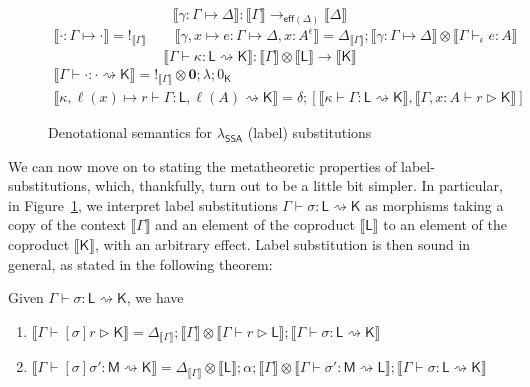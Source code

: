 \documentclass[acmsmall,screen,review]{acmart}
\newcommand{\mb}[1]{\ensuremath{\mathbf{#1}}}
\newcommand{\ms}[1]{\ensuremath{\mathsf{#1}}}
\newcommand{\thyp}[3]{#1 : {#2}^{#3}}
\newcommand{\bhyp}[2]{#1 : #2}
\newcommand{\hasty}[4]{#1 \vdash_{#2} #3: {#4}}
\newcommand{\haslb}[3]{#1 \vdash #2 \rhd #3}
\newcommand{\issubst}[3]{#1: #2 \mapsto #3}
\newcommand{\lbsubst}[4]{#1 \vdash #2: #3 \rightsquigarrow #4}
\newcommand{\dnt}[1]{\llbracket{#1}\rrbracket}
\newcommand{\tmor}[1]{{!}_{#1}}
\newcommand{\dmor}[1]{{\Delta}_{#1}}
\newcommand{\isotopessa}{\(\lambda_{\ms{SSA}}\)}
\begin{document}
\begin{figure}
  \begin{equation*}
    \boxed{\dnt{\issubst{\gamma}{\Gamma}{\Delta}} 
      : \dnt{\Gamma} \to_{\ms{eff}(\Delta)} \dnt{\Delta}}
  \end{equation*}
  \begin{gather*}
    \dnt{\issubst{\cdot}{\Gamma}{\cdot}} = \tmor{\dnt{\Gamma}}
    \qquad
    \dnt{\issubst{\gamma, x \mapsto e}{\Gamma}{\Delta, \thyp{x}{A}{\epsilon}}}
    = \dmor{\dnt{\Gamma}};\dnt{\issubst{\gamma}{\Gamma}{\Delta}} 
      \otimes \dnt{\hasty{\Gamma}{\epsilon}{e}{A}}
  \end{gather*}
  \begin{equation*}
    \boxed{\dnt{\lbsubst{\Gamma}{\kappa}{\ms{L}}{\ms{K}}} 
      : \dnt{\Gamma} \otimes \dnt{\ms{L}} \to \dnt{\ms{K}}}
  \end{equation*}
  \begin{gather*}
    \dnt{\lbsubst{\Gamma}{\cdot}{\cdot}{\ms{K}}} 
      = \tmor{\dnt{\Gamma}} \otimes \mb{0}; \lambda; 0_{\ms{K}}
    \\
    \dnt{\lbsubst{\kappa, \ell(x) \mapsto r}{\Gamma}{\ms{L}, \ell(A)}{\ms{K}}}
      = \delta ; [
      \dnt{\lbsubst{\kappa}{\Gamma}{\ms{L}}{\ms{K}}}, 
      \dnt{\haslb{\Gamma, \bhyp{x}{A}}{r}{\ms{K}}}
    ]
  \end{gather*}
  \caption{Denotational semantics for \isotopessa{} (label) substitutions}
  \Description{}
  \label{fig:ssa-subst-sem} 
\end{figure}

We can now move on to stating the metatheoretic properties of label-substitutions, which,
thankfully, turn out to be a little bit simpler. In particular, in Figure~\ref{fig:ssa-subst-sem},
we interpret label substitutions $\lbsubst{\Gamma}{\sigma}{\ms{L}}{\ms{K}}$ as morphisms taking
a copy of the context $\dnt{\Gamma}$ and an element of the coproduct $\dnt{\ms{L}}$ to an element
of the coproduct $\dnt{\ms{K}}$, with an arbitrary effect. Label substitution is then sound in
general, as stated in the following theorem:
\begin{theorem}
  Given $\lbsubst{\Gamma}{\sigma}{\ms{L}}{\ms{K}}$, we have
  \begin{enumerate}[label=(\alph*)]
    \item $\dnt{\haslb{\Gamma}{[\sigma]r}{\ms{K}}}
      = \dmor{\dnt{\Gamma}}
      ;\dnt{\Gamma} \otimes \dnt{\haslb{\Gamma}{r}{\ms{L}}}
      ;\dnt{\lbsubst{\Gamma}{\sigma}{\ms{L}}{\ms{K}}}$
    \item $\dnt{\lbsubst{\Gamma}{[\sigma]\sigma'}{\ms{M}}{\ms{K}}}
      = \dmor{\dnt{\Gamma}} \otimes \dnt{\ms{L}} ; \alpha
      ; \dnt{\Gamma} \otimes \dnt{\lbsubst{\Gamma}{\sigma'}{\ms{M}}{\ms{L}}}
      ; \dnt{\lbsubst{\Gamma}{\sigma}{\ms{L}}{\ms{K}}}$
  \end{enumerate}
\end{theorem}
\end{document}
